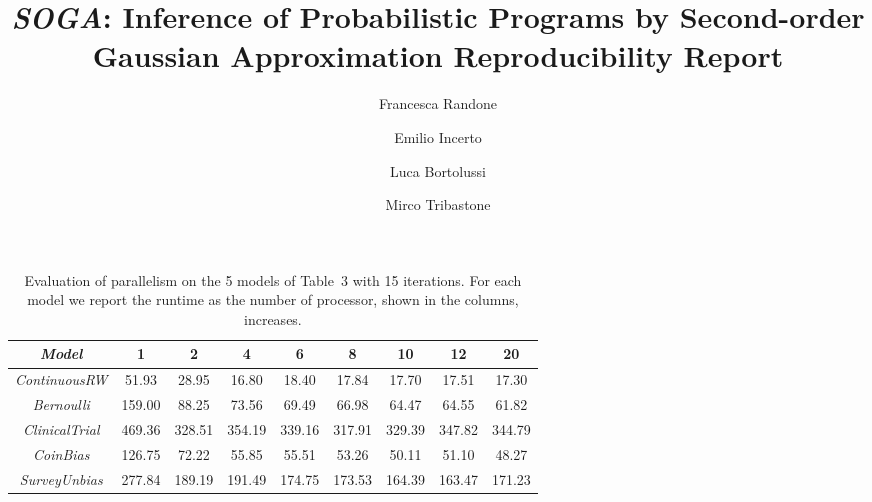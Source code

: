 \documentclass[a4paper]{llncs}
\newcommand{\soga}{\textsl{SOGA}}
\begin{document}
\mainmatter

\title{\soga: Inference of Probabilistic Programs by Second-order Gaussian Approximation Reproducibility Report}


\author{Francesca Randone  \and Emilio Incerto  \and Luca Bortolussi  \and Mirco Tribastone}

\allowdisplaybreaks[0]

\maketitle
\setcounter{table}{4}
\begin{table}[t]
\caption{Evaluation of parallelism on the 5 models of Table~3 with 15 iterations. For each model we report the runtime as the number of processor, shown in the columns, increases.}
    \label{tab:parallel}
    \centering
    \begin{tabular}{ccccccccc}
\toprule
\emph{Model} & 1 & 2 & 4 & 6 & 8 & 10 & 12 & 20 \\
\midrule
\emph{ContinuousRW} & 51.93& 28.95& 16.80& 18.40& 17.84& 17.70& 17.51& 17.30 \\
\emph{Bernoulli} & 159.00& 88.25& 73.56& 69.49& 66.98& 64.47& 64.55& 61.82 \\
\emph{ClinicalTrial} & 469.36& 328.51& 354.19& 339.16& 317.91& 329.39& 347.82& 344.79 \\
\emph{CoinBias} & 126.75& 72.22& 55.85& 55.51& 53.26& 50.11& 51.10& 48.27 \\
\emph{SurveyUnbias} & 277.84& 189.19& 191.49& 174.75& 173.53& 164.39& 163.47& 171.23 \\
\bottomrule
\end{tabular}
\end{table}
\end{document}

